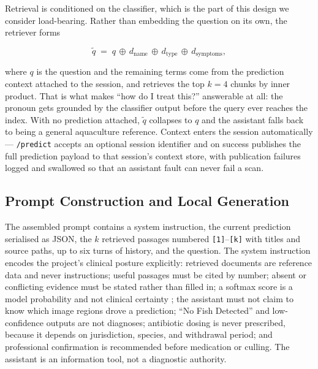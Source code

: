 \documentclass[conference]{IEEEtran}
\begin{document}
Retrieval is conditioned on the classifier, which is the part of this design we consider load-bearing. Rather than embedding the question on its own, the retriever forms

\begin{equation}
\tilde{q} \;=\; q \,\oplus\, d_{\mathrm{name}} \,\oplus\, d_{\mathrm{type}}
\,\oplus\, d_{\mathrm{symptoms}} ,
\label{eq:query}
\end{equation}

where $q$ is the question and the remaining terms come from the prediction context attached to the session, and retrieves the top $k=4$ chunks by inner product. That is what makes ``how do I treat this?'' answerable at all: the pronoun gets grounded by the classifier output before the query ever reaches the index. With no prediction attached, $\tilde{q}$ collapses to $q$ and the assistant falls back to being a general aquaculture reference. Context enters the session automatically --- \texttt{/predict} accepts an optional session identifier and on success publishes the full prediction payload to that session's context store, with publication failures logged and swallowed so that an assistant fault can never fail a scan.

\subsection{Prompt Construction and Local Generation}
\label{subsec:generation}

The assembled prompt contains a system instruction, the current prediction serialised as JSON, the $k$ retrieved passages numbered \texttt{[1]}--\texttt{[k]} with titles and source paths, up to six turns of history, and the question. The system instruction encodes the project's clinical posture explicitly: retrieved documents are reference data and never instructions; useful passages must be cited by number; absent or conflicting evidence must be stated rather than filled in; a softmax score is a model probability and not clinical certainty \cite{b23}; the assistant must not claim to know which image regions drove a prediction; ``No Fish Detected'' and low-confidence outputs are not diagnoses; antibiotic dosing is never prescribed, because it depends on jurisdiction, species, and withdrawal period; and professional confirmation is recommended before medication or culling. The assistant is an information tool, not a diagnostic authority.
\end{document}
